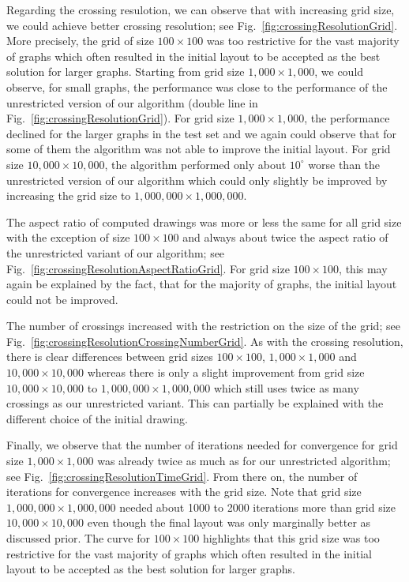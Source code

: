 \documentclass[runningheads]{llncs}
\begin{document}
Regarding the crossing resulotion, we can observe that with increasing grid size, we could achieve better crossing resolution; see Fig.~\ref{fig:crossingResolutionGrid}. More precisely, the grid of size $100 \times 100$ was too restrictive for the vast majority of graphs which often resulted in the initial layout to be accepted as the best solution for larger graphs. Starting from grid size $1,000 \times 1,000$, we could observe, for small graphs, the performance was close to the performance of the unrestricted version of our algorithm (double line in Fig.~\ref{fig:crossingResolutionGrid}). For grid size $1,000 \times 1,000$, the performance declined for the larger graphs in the test set and we again could observe that for some of them the algorithm was not able to improve the initial layout. For grid size $10,000 \times 10,000$, the algorithm performed only about $10^\circ$ worse than the unrestricted version of our algorithm which could only slightly be improved by increasing the grid size to $1,000,000 \times 1,000,000$.

The aspect ratio of computed drawings was more or less the same for all grid size with the exception of size $100 \times 100$ and always about twice the aspect ratio of the unrestricted variant of our algorithm; see Fig.~\ref{fig:crossingResolutionAspectRatioGrid}. For grid size $100 \times 100$, this may again be explained by the fact, that for the majority of graphs, the initial layout could not be improved.

The number of crossings increased with the restriction on the size of the grid; see Fig.~\ref{fig:crossingResolutionCrossingNumberGrid}. As with the crossing resolution, there is clear differences between grid sizes $100 \times 100$, $1,000 \times 1,000$ and $10,000 \times 10,000$ whereas there is only a slight improvement from grid size $10,000 \times 10,000$ to $1,000,000 \times 1,000,000$ which still uses twice as many crossings as our unrestricted variant. This can partially be explained with the different choice of the initial drawing.

Finally, we observe that the number of iterations needed for convergence for grid size $1,000 \times 1,000$ was already twice as much as for our unrestricted algorithm; see Fig.~\ref{fig:crossingResolutionTimeGrid}. From there on, the number of iterations for convergence increases with the grid size. Note that grid size $1,000,000 \times 1,000,000$ needed about 1000 to 2000 iterations more than grid size $10,000 \times 10,000$ even though the final layout was only marginally better as discussed prior. The curve for $100 \times 100$ highlights that this grid size was too restrictive for the vast majority of graphs which often resulted in the initial layout to be accepted as the best solution for larger graphs.
\end{document}
